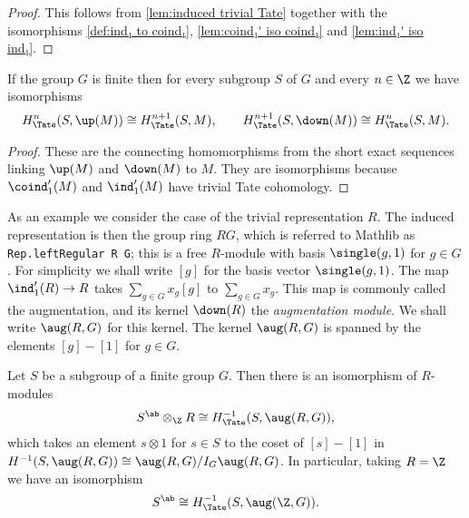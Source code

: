 \begin{proof}
	\leanok
	This follows from \ref{lem:induced trivial Tate}
	together with the isomorphisms \ref{def:ind₁ to coind₁},
	\ref{lem:coind₁' iso coind₁} and \ref{lem:ind₁' iso ind₁}.
\end{proof}

\begin{corollary}	\label{cor:Tate up down isos}
	\leanok
	If the group $G$ is finite then for every subgroup $S$ of $G$
	and every $n \in \Z$ we have isomorphisms
	\[
		H^n_{\Tate}(S, \up(M)) \cong H^{n+1}_{\Tate}(S,M),
		\qquad
		H^{n+1}_{\Tate}(S, \down(M)) \cong H^{n}_{\Tate}(S,M).
	\]
\end{corollary}

\begin{proof}
	\leanok
	These are the connecting homomorphisms from the
	short exact sequences linking $\up(M)$ and $\down(M)$ to $M$.
	They are isomorphisms because $\coind_1'(M)$ and $\ind_1'(M)$ have trivial Tate cohomology.
\end{proof}

\begin{definition} \label{def:augmentation module}
	\leanok
	As an example we consider the case of the trivial representation $R$.
	The induced representation is then the group ring $RG$, which is referred to
	Mathlib as \verb|Rep.leftRegular R G|; this is a free $R$-module with basis
	$\single(g,1)$ for $g \in G$.
	For simplicity we shall write $[g]$ for the basis vector $\single(g,1)$.
	The map $\ind_1'(R) \to R$ takes $\sum_{g\in G} x_g [g]$ to $\sum_{g \in G} x_g$.
	This map is commonly called the augmentation, and its kernel $\down(R)$ the
	\emph{augmentation module}.
	We shall write $\aug(R,G)$ for this kernel.
	The kernel $\aug(R,G)$ is spanned by the elements $[g]-[1]$ for $g \in G$.
\end{definition}

\begin{lemma} \label{lem:Tate -1 aug}
	Let $S$ be a subgroup of a finite group $G$.
	Then there is an isomorphism of $R$-modules
	\[
		S^{\ab} \otimes_{\Z} R \cong H^{-1}_{\Tate}(S,\aug(R,G)),
	\]
	which takes an element $s \otimes 1$ for $s \in S$ to the coset of $[s]-[1]$
	in $H^{-1}(S,\aug(R,G)) \cong \aug(R,G) / I_G \aug(R,G)$.
	In particular, taking $R = \Z$ we have an isomorphism
	\[
		S^{\ab} \cong H^{-1}_{\Tate}(S,\aug(\Z,G)).
	\]
\end{lemma}

